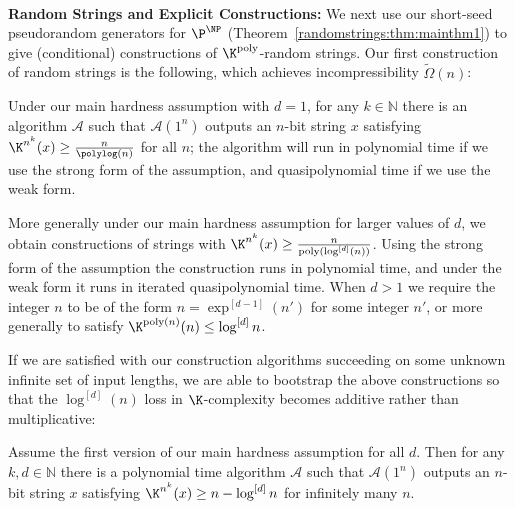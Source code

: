 ~\\
{\bf \noindent Random Strings and Explicit Constructions:} We next use our short-seed pseudorandom generators for $\P^{\NP} $ (Theorem~\ref{randomstrings:thm:mainthm1}) to give (conditional) constructions of $\K^{\poly}$-random strings. Our first construction of random strings is the following, which achieves incompressibility $\tilde{\Omega}(n)$:
\begin{theorem}

Under our main hardness assumption with $d=1$, for any $k \in \mathbb{N}$ there is an algorithm $\mathcal{A}$ such that $\mathcal{A}(1^n)$ outputs an $n$-bit string $x$ satisfying $\K^{n^k}(x) \geq \frac{n}{\polylog(n)}$ for all $n$; the algorithm will run in polynomial time if we use the strong form of the assumption, and quasipolynomial time if we use the weak form.

More generally under our main hardness assumption for larger values of $d$, we obtain constructions of strings with $\K^{n^k}(x) \geq \frac{n}{\poly(\log^{[d]}(n))}$. Using the strong form of the assumption the construction runs in polynomial time, and under the weak form it runs in iterated quasipolynomial time. When $d > 1$ we require the integer $n$ to be of the form $n = \exp^{[d-1]}(n')$ for some integer $n'$, or more generally to satisfy $\K^{\poly(n)}(n) \leq \log^{[d]}n$.
\end{theorem}

If we are satisfied with our construction algorithms succeeding on some unknown infinite set of input lengths, we are able to bootstrap the above constructions so that the $\log^{[d]}(n)$ loss in $\K$-complexity becomes additive rather than multiplicative:
\begin{theorem}

Assume the first version of our main hardness assumption for all $d$.
Then for any $k,d \in \mathbb{N}$ there is a polynomial time algorithm $\mathcal{A}$ such that $\mathcal{A}(1^n)$ outputs an $n$-bit string $x$ satisfying $\K^{n^k}(x) \geq n - \log^{[d]}n$ for infinitely many $n$.
\end{theorem}

